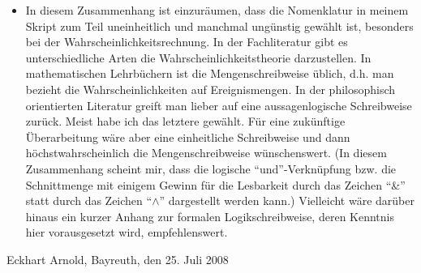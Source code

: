 \begin{itemize}
  \item In diesem Zusammenhang ist einzuräumen, dass die Nomenklatur in meinem
  Skript zum Teil uneinheitlich und manchmal ungünstig gewählt ist, besonders
  bei der Wahrscheinlichkeitsrechnung. In der Fachliteratur gibt es
  unterschiedliche Arten die Wahrscheinlichkeitstheorie darzustellen. In
  mathematischen Lehrbüchern ist die Mengenschreibweise üblich, d.h. man
  bezieht die Wahrscheinlichkeiten auf Ereignismengen. In der philosophisch
  orientierten Literatur greift man lieber auf eine aussagenlogische
  Schreibweise zurück. Meist habe ich das letztere gewählt. Für eine zukünftige
  Überarbeitung wäre aber eine einheitliche Schreibweise und dann
  höchstwahrscheinlich die Mengenschreibweise wünschenswert. (In diesem
  Zusammenhang scheint mir, dass die logische "`und"'-Verknüpfung bzw. die
  Schnittmenge mit einigem Gewinn für die Lesbarkeit durch das
  Zeichen "`\&"' statt durch das Zeichen "`$\wedge$"' dargestellt werden kann.)
  Vielleicht wäre darüber hinaus ein kurzer Anhang zur formalen
  Logikschreibweise, deren Kenntnis hier vorausgesetzt wird, empfehlenswert.
\end{itemize}

\begin{flushright}
Eckhart Arnold, Bayreuth, den 25. Juli 2008
\end{flushright}

